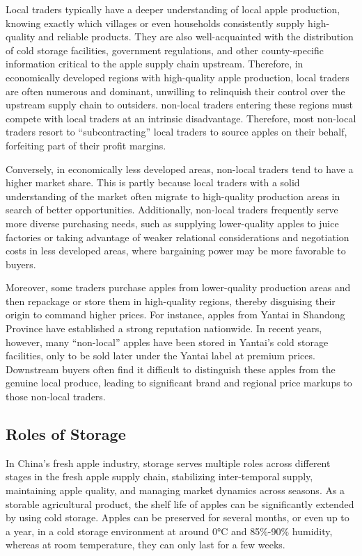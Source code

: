 Local traders typically have a deeper understanding of local apple production, knowing exactly which villages or even households consistently supply high-quality and reliable products. They are also well-acquainted with the distribution of cold storage facilities, government regulations, and other county-specific information critical to the apple supply chain upstream. Therefore, in economically developed regions with high-quality apple production, local traders are often numerous and dominant, unwilling to relinquish their control over the upstream supply chain to outsiders. non-local traders entering these regions must compete with local traders at an intrinsic disadvantage. Therefore, most non-local traders resort to ``subcontracting'' local traders to source apples on their behalf, forfeiting part of their profit margins.  

Conversely, in economically less developed areas, non-local traders tend to have a higher market share. This is partly because local traders with a solid understanding of the market often migrate to high-quality production areas in search of better opportunities. Additionally, non-local traders frequently serve more diverse purchasing needs, such as supplying lower-quality apples to juice factories or taking advantage of weaker relational considerations and negotiation costs in less developed areas, where bargaining power may be more favorable to buyers.  

Moreover, some traders purchase apples from lower-quality production areas and then repackage or store them in high-quality regions, thereby disguising their origin to command higher prices. For instance, apples from Yantai in Shandong Province have established a strong reputation nationwide. In recent years, however, many ``non-local'' apples have been stored in Yantai’s cold storage facilities, only to be sold later under the Yantai label at premium prices. Downstream buyers often find it difficult to distinguish these apples from the genuine local produce, leading to significant brand and regional price markups to those non-local traders.


\subsection{Roles of Storage \label{Section: role of Storage}}
\noindent In China's fresh apple industry, storage serves multiple roles across different stages in the fresh apple supply chain, stabilizing inter-temporal supply, maintaining apple quality, and managing market dynamics across seasons. As a storable agricultural product, the shelf life of apples can be significantly extended by using cold storage. Apples can be preserved for several months, or even up to a year, in a cold storage environment at around 0°C and 85\%-90\% humidity, whereas at room temperature, they can only last for a few weeks.

